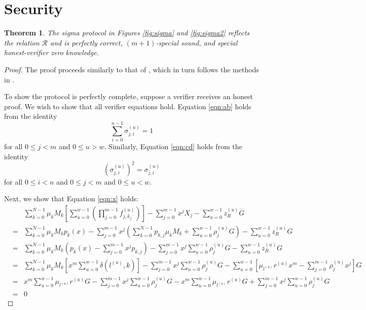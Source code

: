 \documentclass{article}
\newcommand{\sumi}{\sum_{i=0}^{n-1}}
\newcommand{\sumj}{\sum_{j=0}^{m-1}}
\newcommand{\sumk}{\sum_{k=0}^{N-1}}
\newcommand{\sumu}{\sum_{u=0}^{w-1}}
\newtheorem{theorem}{Theorem}
\theoremstyle{definition}
\begin{document}
\section{Security}
\begin{theorem}
The sigma protocol in Figures \ref{fig:sigma} and \ref{fig:sigma2} reflects the relation $\mathcal{R}$ and is perfectly correct, $(m+1)$-special sound, and special honest-verifier zero knowledge.
\end{theorem}

\begin{proof}
The proof proceeds similarly to that of \cite{triptych}, which in turn follows the methods in \cite{groth,bootle}.

To show the protocol is perfectly complete, suppose a verifier receives an honest proof.
We wish to show that all verifier equations hold.
Equation \ref{eqn:ab} holds from the identity $$\sumi \sigma_{j,i}^{(u)} = 1$$ for all $0 \leq j < m$ and $0 \leq u > w$.
Similarly, Equation \ref{eqn:cd} holds from the identity $$(\sigma_{j,i}^{(u)})^2 = \sigma_{j,i}^{(u)}$$ for all $0 \leq i < n$ and $0 \leq j < m$ and $0 \leq u < w$.

Next, we show that Equation \ref{eqn:x} holds:
\begin{eqnarray*}
&& \sumk \mu_kM_k \left[ \sumu \left( \prod_{j=0}^{m-1} f^{(u)}_{j,k_j} \right) \right] - \sumj x^jX_j - \sumu z^{(u)}_RG \\
&=& \sumk \mu_kM_k p_k(x) - \sumj x^j \left( \sumk p_{k,j}\mu_kM_k + \sumu \rho^{(u)}_jG \right) - \sumu z^{(u)}_RG \\
&=& \sumk \mu_kM_k \left( p_k(x) - \sumj x^j p_{k,j} \right) - \sumj x^j \sumu \rho^{(u)}_jG - \sumu z^{(u)}_RG \\
&=& \sumk \mu_kM_k \left[ x^m \sumu \delta\left( l^{(u)},k \right) \right] - \sumj x^j \sumu \rho^{(u)}_jG - \sumu\left[ \mu_{l^{(u)}}r^{(u)}x^m - \sumj \rho^{(u)}_jx^j \right]G \\
&=& x^m\sumu \mu_{l^{(u)}}r^{(u)}G - \sumj x^j \sumu \rho^{(u)}_jG - x^m\sumu \mu_{l^{(u)}}r^{(u)}G + \sumj x^j \sumu \rho^{(u)}_jG \\
&=& 0
\end{eqnarray*}


\end{proof}
\end{document}
